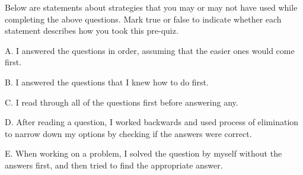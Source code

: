 \documentclass{ximera}
\begin{document}
\begin{question}

Below are statements about strategies that you may or may not have used while completing the above questions.  Mark true or false to indicate whether each statement describes how you took this pre-quiz. 

\begin{question}

    A. I answered the questions in order, assuming that the easier ones would come first.

    \begin{multipleChoice}
    \end{multipleChoice}
    
\end{question}
\begin{question}
    
    B. I answered the questions that I knew how to do first.

    \begin{multipleChoice}
    \end{multipleChoice}
    
\end{question}
\begin{question}
    
    C. I read through all of the questions first before answering any.

    \begin{multipleChoice}
    \end{multipleChoice}
    
\end{question}
\begin{question}
    
    D. After reading a question, I worked backwards and used process of elimination to narrow down my options by checking if the answers were correct.

    \begin{multipleChoice}
    \end{multipleChoice}
    
\end{question}  
\begin{question}    
    
    E. When working on a problem, I solved the question by myself without the answers first, and then tried to find the appropriate answer.


\end{question}
\end{question}
\end{document}
